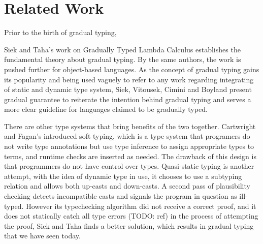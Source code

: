 \section{Related Work}

Prior to the birth of gradual typing, 

Siek and Taha's work on Gradually Typed Lambda Calculus\cite{siek2006gradual}
establishes the fundamental theory about gradual typing.
By the same authors,
the work is pushed further for object-based languages\cite{siek2007gradual}.
As the concept of gradual typing gains its popularity and being used vaguely to
refer to any work regarding integrating of static and dynamic type system,
Siek, Vitousek, Cimini and Boyland present gradual guarantee\cite{siek2015refined}
to reiterate the intention behind gradual typing and serves a more clear guideline for
languages claimed to be gradually typed.



There are other type systems that bring benefits of the two together.
Cartwright and Fagan's introduced soft typing, which is a type system
that programers do not write type annotations but use type inference to
assign appropriate types to terms, and runtime checks are inserted as needed.
The drawback of this design is that programmers do not have control over types.
Quasi-static typing is another attempt, with the idea of dynamic type in use,
it chooses to use a subtyping relation and allows both up-casts and down-casts.
A second pass of plausibility checking detects incompatible casts and signals the program
in question as ill-typed. However its typechecking algorithm did not receive a correct proof,
and it does not statically catch all type errors (TODO: ref)
in the process of attempting the proof, Siek and Taha finds a better solution, 
which results in gradual typing that we have seen today.




